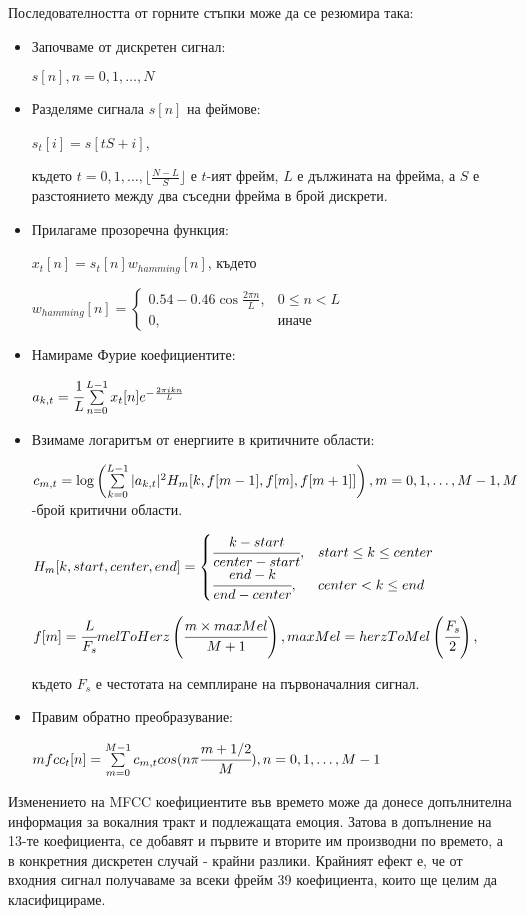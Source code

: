 \documentclass[main.tex]{subfiles}
\begin{document}
    Последователността от горните стъпки може да се резюмира така:
    \begin{itemize}
        \item Започваме от дискретен сигнал:
        
        $s[n], n = 0, 1, \ldots, N$
        \item Разделяме сигнала $s[n]$ на феймове:
        
        $s_t[i] = s[tS + i]$,
        
        където $t = 0, 1,\ldots,\lfloor \frac{N - L}{S} \rfloor $ е $t$-ият фрейм, $L$ е дължината на фрейма, а $S$ е разстоянието между два съседни фрейма в брой дискрети.
        \item Прилагаме прозоречна функция:
        
        $x_t[n] = s_t[n]w_{hamming}[n]$, където
        
        $w_{hamming}[n] = \begin{cases} 
            0.54 - 0.46 \cos{\frac{2\pi n}{L}}, & 0\leq n < L \\
            0, & \text{иначе}
        \end{cases}$

        \item Намираме Фурие коефициентите:
        
        $a_{k, t} = \cfrac{1}{L} \sum\limits_{n=0}^{L-1} x_t[n] e^{-\frac{2\pi i k n}{L}}$
        \item Взимаме логаритъм от енергиите в критичните области: 
        
        $c_{m, t} = \log\left(\sum\limits_{k = 0}^{L-1} |a_{k, t}|^2 H_{m}[k, f[m-1], f[m], f[m+1]]\right), m = 0, 1, \ldots, M-1, M$-брой критични области.
        
        $ H_{m}[k, start, center, end] = 
            \begin{cases}
                \cfrac{k - start}{center - start}, & start \leq k \leq center\\
                \cfrac{end - k}{end - center}, & center < k \leq end
            \end{cases}$

        $f[m] = \cfrac{L}{F_s} melToHerz\left(\cfrac{m\times maxMel}{M+1}\right), maxMel = herzToMel\left(\cfrac{F_s}{2}\right),$

        където $F_s$ е честотата на семплиране на първоначалния сигнал.
        \item Правим обратно преобразувание:

        $mfcc_t[n] = \sum\limits_{m = 0}^{M-1} c_{m, t} cos(n\pi \cfrac{m+1/2}{M}), n = 0, 1, \ldots, M-1$
    \end{itemize}

    Изменението на MFCC коефициентите във времето може да донесе допълнителна информация за вокалния тракт и подлежащата емоция. Затова в допълнение на 13-те коефициента, се добавят и първите и вторите им производни по времето, а в конкретния дискретен случай - крайни разлики.
    Крайният ефект е, че от входния сигнал получаваме за всеки фрейм 39 коефициента, които ще целим да класифицираме.
\end{document}
